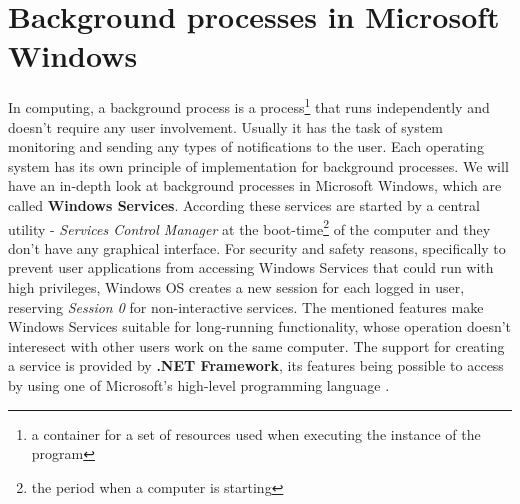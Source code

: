 \section{Background processes in Microsoft Windows}
\label{section:backgroundProc}
In computing, a background process is a process\footnote{a container for a set of resources used when executing the instance of the program} that runs independently and doesn't require any user involvement. Usually it has the task of system monitoring and sending any types of notifications to the user. Each operating system has its own principle of implementation for background processes. We will have an in-depth look at background processes in Microsoft Windows, which are called \textbf{Windows Services}. According \cite{winInternals} these services are started by a central utility - \textit{Services Control Manager} at the boot-time\footnote{the period when a computer is starting} of the computer and they don't have any graphical interface. For security and safety reasons, specifically to prevent user applications from accessing Windows Services that could run with high privileges, Windows OS creates a new session for each logged in user, reserving \textit{Session 0} for non-interactive services. The mentioned features make Windows Services suitable for long-running functionality, whose operation doesn't interesect with other users work on the same computer. The support for creating a service is provided by \textbf{.NET Framework}, its features being possible to access by using one of Microsoft's high-level programming language \CSharp.

